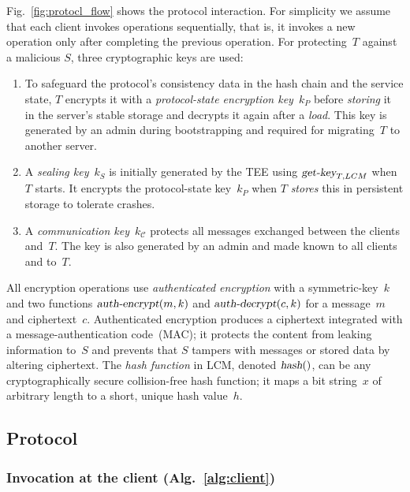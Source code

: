 \documentclass[11pt]{article}
\theoremstyle{plain-boldhead}
\theoremstyle{definition-boldhead}
\newcommand{\op}[1]{\textsl{#1}}
\newcommand{\CC}{\ensuremath{\mathcal{C}}\xspace}
\newcommand{\pp}{LCM\xspace}
\begin{document}
Fig.~\ref{fig:protocl_flow} shows the protocol interaction.
%
For simplicity we assume that each client invokes operations sequentially,
that is, it invokes a new operation only after completing the
previous operation.
% 
For protecting~$T$ against a malicious $S$, three cryptographic keys are
used:
\begin{enumerate}
\item To safeguard the protocol's consistency data in the hash chain and
  the service state, $T$ encrypts it with a \emph{protocol-state encryption
    key}~$k_{P}$ before \op{storing} it in the server's stable storage and
  decrypts it again after a \op{load}.  This key is generated by an admin
  during bootstrapping and required for migrating~$T$ to another server.

\item A \emph{sealing key}~$k_S$ is initially generated by the TEE using
  $\op{get-key}_{T,\pp}$ when $T$ starts.  It encrypts the protocol-state
  key~$k_P$ when $T$ \op{stores} this in persistent storage to tolerate
  crashes.

\item A \emph{communication key}~$k_{\CC}$ protects all messages exchanged
  between the clients and~$T$.  The key is also generated by an admin and
  made known to all clients and to~$T$.
\end{enumerate}

All encryption operations use \emph{authenticated encryption} with a
symmetric-key~$k$ and two functions $\op{auth-encrypt}(m, k)$ and
$\op{auth-decrypt}(c, k)$ for a message~$m$ and ciphertext~$c$.
Authenticated encryption produces a ciphertext integrated with a
message-authentication code~(MAC); it protects the content from leaking
information to~$S$ and prevents that $S$ tampers with messages or stored
data by altering ciphertext.
% 
The \emph{hash function} in \pp, denoted $\op{hash}()$, can be any
cryptographically secure collision-free hash function; it maps a bit
string~$x$ of arbitrary length to a short, unique hash value~$h$.


\subsection{Protocol}
\label{sec:proto-details}


\subsubsection{Invocation at the client (Alg.~\ref{alg:client})}
\end{document}
